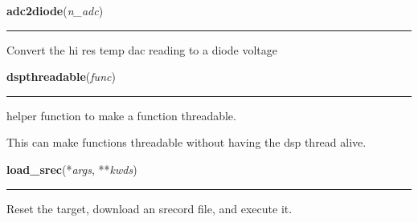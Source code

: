     \vspace{0.5ex}

    \begin{boxedminipage}{\textwidth}

    \raggedright \textbf{adc2diode}(\textit{n\_adc})

    \vspace{-1.5ex}

    \rule{\textwidth}{0.5\fboxrule}
    Convert the hi res temp dac reading to a diode voltage

    \vspace{1ex}

    \end{boxedminipage}

    \label{dsp:dspthreadable}

    \vspace{0.5ex}

    \begin{boxedminipage}{\textwidth}

    \raggedright \textbf{dspthreadable}(\textit{func})

    \vspace{-1.5ex}

    \rule{\textwidth}{0.5\fboxrule}
    helper function to make a function threadable.

    This can make functions threadable without having the dsp thread alive.

    \vspace{1ex}

    \end{boxedminipage}

    \label{dsp:load_srec}

    \vspace{0.5ex}

    \begin{boxedminipage}{\textwidth}

    \raggedright \textbf{load\_srec}(*\textit{args}, **\textit{kwds})

    \vspace{-1.5ex}

    \rule{\textwidth}{0.5\fboxrule}
    Reset the target, download an srecord file, and execute it.

    \vspace{1ex}

    \end{boxedminipage}

